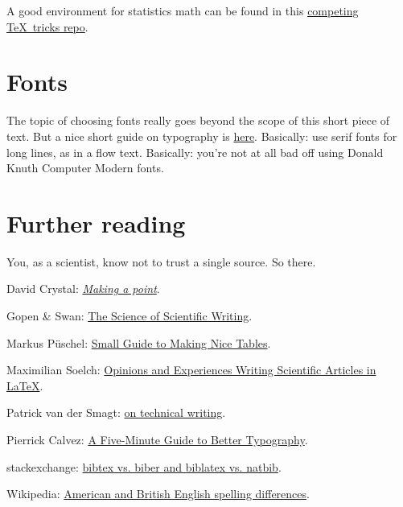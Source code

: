 \documentclass{article}
\begin{document}
A good environment for statistics math can be found in this \href{https://github.com/msoelch/tex}{competing \TeX\ tricks repo}.


\section{Fonts}
The topic of choosing fonts really goes beyond the scope of this short piece of text.
But a nice short guide on typography is 
\href{https://www.pierrickcalvez.com/journal/a-five-minutes-guide-to-better-typography}{here}.
Basically: use serif fonts for long lines, as in a flow text.  
Basically: you're not at all bad off using Donald Knuth Computer Modern fonts.


\section*{Further reading}
You, as a scientist, know not to trust a single source.  So there.
\medskip
\parindent0pt

David Crystal: \href{https://www.theguardian.com/books/2015/sep/17/making-a-point-pernickety-story-english-punctuation-david-crystal-review}{\textsl{Making a point}}.

Gopen \& Swan: \href{https://github.com/smagt/LaTeX/blob/master/The\%20science\%20of\%20scientific\%20writing.pdf}{The Science of Scientific Writing}.

Markus P\"uschel: \href{http://users.ece.cmu.edu/~pueschel/teaching/guides/guide-tables.pdf}{Small Guide to Making Nice Tables}.


Maximilian Soelch: \href{https://github.com/msoelch/tex}{Opinions and Experiences Writing Scientific Articles in \LaTeX}.


Patrick van der Smagt: \href{https://smagt.github.io/readable\%20paper\%20writing.html}{on technical writing}.

Pierrick Calvez: \href{https://www.pierrickcalvez.com/journal/a-five-minutes-guide-to-better-typography}{A Five-Minute Guide to Better Typography}.

stackexchange: \href{https://tex.stackexchange.com/questions/25701/bibtex-vs-biber-and-biblatex-vs-natbib}{bibtex vs. biber and biblatex vs. natbib}.

Wikipedia: \href{http://en.wikipedia.org/wiki/American_and_British_English_spelling_differences}{American and British English spelling differences}.


 
\end{document}
